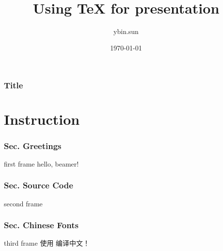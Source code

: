 ﻿\documentclass{beamer}
\title{Using \TeX{} for presentation}
\author{ybin.sun}
\institute{\texttt{ybin.sun@gmail.com}}
\date{\today}
\begin{document}
\section[Title]{Title}
\begin{frame}[plain]
  \titlepage
\end{frame}

\part[Instruction]{Instruction}
\section[Sec. Greetings]{Sec. Greetings}
\begin{frame}{first frame}
hello, beamer!
\end{frame}

\section[Sec. Source Code]{Sec. Source Code}
\begin{frame}{second frame}

\end{frame}

\section[Sec. Chinese Fonts]{Sec. Chinese Fonts}
\begin{frame}{third frame}
使用 \XeTeX{} 编译中文！
\end{frame}
\end{document}
